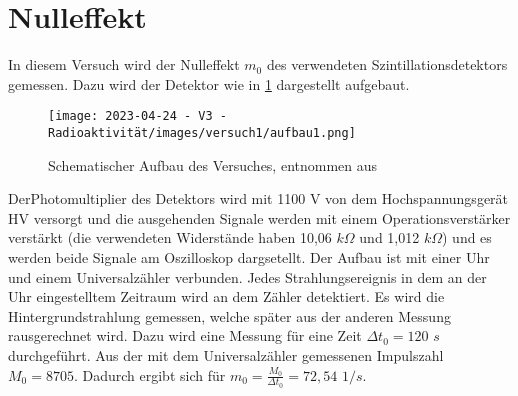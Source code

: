 \documentclass[../protokoll.tex]{subfiles}
\begin{document}
\section{Nulleffekt}\label{sec:Nulleffekt}
In diesem Versuch wird der Nulleffekt $m_0$ des verwendeten Szintillationsdetektors gemessen. Dazu wird der Detektor wie in \ref{aufbau1} dargestellt aufgebaut.
\begin{figure}[h]
    \centering
    \texttt{[image: 2023-04-24 - V3 - Radioaktivität/images/versuch1/aufbau1.png]}
    \caption{Schematischer Aufbau des Versuches, entnommen aus \cite{script}}
    \label{aufbau1}
\end{figure}
DerPhotomultiplier des Detektors wird mit 1100 V von dem Hochspannungsgerät HV versorgt und die ausgehenden Signale werden mit einem Operationsverstärker verstärkt (die verwendeten Widerstände haben 10,06 $k\Omega$ und 1,012 $k\Omega$) und es werden beide Signale am Oszilloskop dargsetellt. Der Aufbau ist mit einer Uhr und einem Universalzähler verbunden. Jedes Strahlungsereignis in dem an der Uhr eingestelltem Zeitraum wird an dem Zähler detektiert. Es wird die Hintergrundstrahlung gemessen, welche später aus der anderen Messung rausgerechnet wird. Dazu wird eine Messung für eine Zeit $\Delta t_0=120$ $s$ durchgeführt. Aus der mit dem Universalzähler gemessenen Impulszahl $M_0=8705$. Dadurch ergibt sich für $m_0=\frac{M_0}{\Delta t_0}=72,54$ $1/s$.
\end{document}
